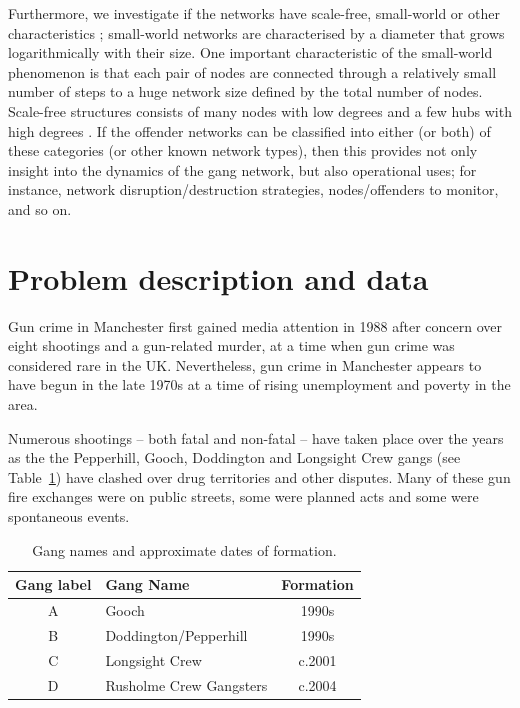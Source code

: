 \documentclass[twocolumn]{svjour3}          %
\theoremstyle{definition}
\begin{document}
Furthermore, we investigate if the networks have scale-free,
small-world or other characteristics
\citep{Watts1999,AlbertBarabasi2002,Newman2003}; small-world networks
are characterised by a diameter that grows logarithmically with their
size. One important characteristic of the small-world phenomenon is
that each pair of nodes are connected through a relatively small
number of steps to a huge network size defined by the total number of
nodes. Scale-free structures consists of many nodes with low degrees
and a few hubs with high degrees
\citep{AlbAlbNak04,CostaRodriguesTraviesoVillasBoas2007,Jackson2008}. If
the offender networks can be classified into either (or both) of these
categories (or other known network types), then this provides not only
insight into the dynamics of the gang network, but also operational
uses; for instance, network disruption/destruction strategies,
nodes/offenders to monitor, and so on.


\section{Problem description and data}\label{sec:problemdescription}

Gun crime in Manchester first gained media attention in 1988 after
concern over eight shootings and a gun-related murder, at a time when
gun crime was considered rare in the UK. Nevertheless, gun crime in
Manchester appears to have begun in the late 1970s at a time of rising
unemployment and poverty in the area.

Numerous shootings -- both fatal and non-fatal -- have taken place
over the years as the the Pepperhill, Gooch, Doddington and Longsight
Crew gangs (see Table~\ref{table:gangnames}) have clashed over drug
territories and other disputes. Many of these gun fire exchanges were
on public streets, some were planned acts and some were spontaneous
events.

\begin{table}[htb]
\centering
\begin{tabularx}{\columnwidth}{c X c}
\hline
Gang label & Gang Name & Formation  \\ %
\hline
A & Gooch & 1990s\\
B & Doddington/Pepperhill & 1990s\\
C & Longsight Crew &  c.2001\\
D & Rusholme Crew Gangsters & c.2004\\ %
\hline
\end{tabularx}
\caption{Gang names and approximate dates of formation.}
\label{table:gangnames}
\end{table}
\end{document}
